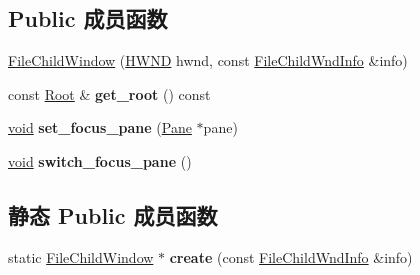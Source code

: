 \subsection*{Public 成员函数}
\begin{DoxyCompactItemize}
\item 
\hyperlink{struct_file_child_window_a3c224e72029662287701798a817342b0}{File\+Child\+Window} (\hyperlink{interfacevoid}{H\+W\+ND} hwnd, const \hyperlink{struct_file_child_wnd_info}{File\+Child\+Wnd\+Info} \&info)
\item 
\mbox{\label{struct_file_child_window_a2544942f446aa1b822e9f108781c5042}} 
const \hyperlink{struct_root}{Root} \& {\bfseries get\+\_\+root} () const
\item 
\mbox{\label{struct_file_child_window_a1b1d75045f1bb905305bfa4f8e27f2f7}} 
\hyperlink{interfacevoid}{void} {\bfseries set\+\_\+focus\+\_\+pane} (\hyperlink{struct_pane}{Pane} $\ast$pane)
\item 
\mbox{\label{struct_file_child_window_a6de3477a51fede06f127ba3a122575b3}} 
\hyperlink{interfacevoid}{void} {\bfseries switch\+\_\+focus\+\_\+pane} ()
\end{DoxyCompactItemize}
\subsection*{静态 Public 成员函数}
\begin{DoxyCompactItemize}
\item 
\mbox{\label{struct_file_child_window_a73336896755c3d4e25cbac162e03805e}} 
static \hyperlink{struct_file_child_window}{File\+Child\+Window} $\ast$ {\bfseries create} (const \hyperlink{struct_file_child_wnd_info}{File\+Child\+Wnd\+Info} \&info)
\end{DoxyCompactItemize}
